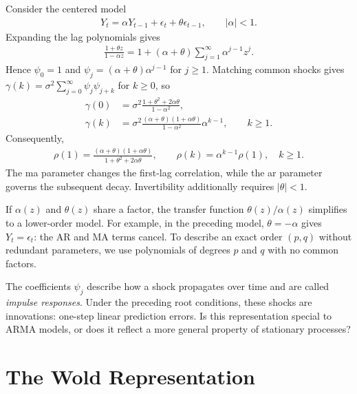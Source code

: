 \documentclass[a4paper,12pt]{article}
\begin{document}
\begin{example}
	Consider the centered model
	\begin{align}
		Y_t=\alpha Y_{t-1}+\epsilon_t+\theta\epsilon_{t-1},\qquad |\alpha|<1.
	\end{align}
	Expanding the lag polynomials gives
	\begin{align}
		\frac{1+\theta z}{1-\alpha z}
		=1+(\alpha+\theta)\sum_{j=1}^{\infty}\alpha^{j-1}z^j.
	\end{align}
	Hence $\psi_0=1$ and $\psi_j=(\alpha+\theta)\alpha^{j-1}$ for $j\ge1$.
	Matching common shocks gives $\gamma(k)=\sigma^2\sum_{j=0}^{\infty}\psi_j\psi_{j+k}$ for $k\ge0$, so
	\begin{align}
		\gamma(0)&=\sigma^2\frac{1+\theta^2+2\alpha\theta}{1-\alpha^2},\\
		\gamma(k)&=\sigma^2\frac{(\alpha+\theta)(1+\alpha\theta)}{1-\alpha^2}
		\alpha^{k-1},\qquad k\ge1.
	\end{align}
	Consequently,
	\begin{align}
		\rho(1)=\frac{(\alpha+\theta)(1+\alpha\theta)}{1+\theta^2+2\alpha\theta},
		\qquad \rho(k)=\alpha^{k-1}\rho(1),\quad k\ge1.
	\end{align}
	The \gls{ma} parameter changes the first-lag correlation, while the \gls{ar} parameter governs the subsequent decay.
	Invertibility additionally requires $|\theta|<1$.
\end{example}

\begin{remark}
	If $\alpha(z)$ and $\theta(z)$ share a factor, the transfer function
	$\theta(z)/\alpha(z)$ simplifies to a lower-order model.
	For example, in the preceding model, $\theta=-\alpha$ gives $Y_t=\epsilon_t$:
	the AR and MA terms cancel.
	To describe an exact order $(p,q)$ without redundant parameters,
	we use polynomials of degrees $p$ and $q$ with no common factors.
\end{remark}

\begin{remark}
	The coefficients $\psi_j$ describe how a shock propagates over time and are called
	\emph{impulse responses}.
	Under the preceding root conditions, these shocks are innovations: one-step linear prediction errors.
	Is this representation special to ARMA models, or does it reflect a more general property of stationary processes?
\end{remark}

\section{The Wold Representation}\label{sec-wold}
\end{document}
